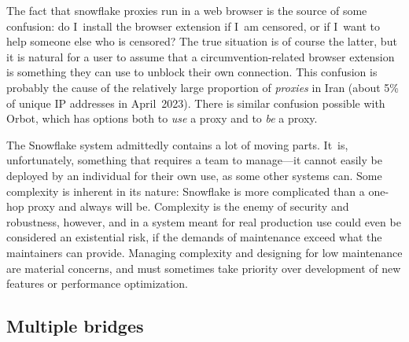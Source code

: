 \documentclass[letterpaper,twocolumn]{article}
\begin{document}
The fact that snowflake proxies run in a web browser
is the source of some confusion:
do I~install the browser extension if I~am censored,
or if I~want to help someone else who is censored?
The true situation is of course the latter,
but it is natural for a user to assume
that a circumvention-related browser extension is something
they can use to unblock their own connection.
This confusion is probably the cause of
the relatively large proportion of \emph{proxies} in Iran
(about 5\% of unique IP addresses in April~2023).
There is similar confusion possible with Orbot,
which has options both
to \emph{use} a proxy and to \emph{be} a proxy.

The Snowflake system
admittedly contains a lot of moving parts.
It~is, unfortunately,
something that requires a team to manage---it
cannot easily be deployed by an individual for their own use,
as some other systems can.
Some complexity is inherent in its nature:
Snowflake is more complicated than a one-hop proxy
and always will be.
Complexity is the enemy of security and robustness, however,
and in a system meant for real production use
could even be considered an existential risk,
if the demands of maintenance exceed what the maintainers can provide.
Managing complexity and designing for low maintenance
are material concerns,
and must sometimes take priority over
development of new features or performance optimization.


\subsection{Multiple bridges}
\label{sec:multi-bridge}
\end{document}

